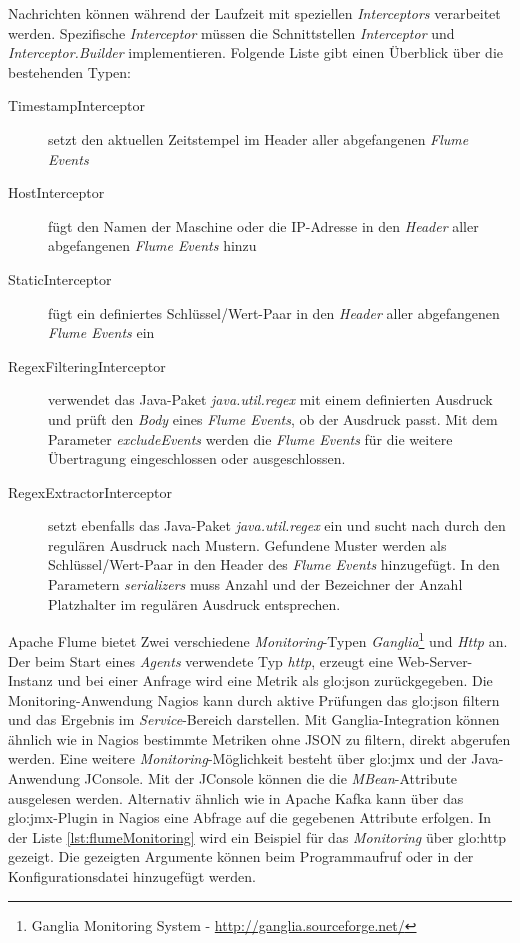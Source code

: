 Nachrichten können während der Laufzeit mit speziellen \textit{Interceptors} verarbeitet werden. Spezifische \textit{Interceptor} müssen die Schnittstellen \textit{Interceptor} und \textit{Interceptor.Builder} implementieren. Folgende Liste gibt einen Überblick über die bestehenden Typen:
\begin{description}
	\item[TimestampInterceptor] setzt den aktuellen Zeitstempel im Header aller abgefangenen \textit{Flume Events} 
	\item[HostInterceptor] fügt den Namen der Maschine oder die IP-Adresse in den \textit{Header} aller abgefangenen \textit{Flume Events} hinzu 
	\item[StaticInterceptor] fügt ein definiertes Schlüssel/Wert-Paar in den \textit{Header} aller abgefangenen \textit{Flume Events} ein 
	\item[RegexFilteringInterceptor] verwendet das Java-Paket \textit{java.util.regex} mit einem definierten Ausdruck und prüft den \textit{Body} eines \textit{Flume Events}, ob der Ausdruck passt. Mit dem Parameter \textit{excludeEvents} werden die \textit{Flume Events} für die weitere Übertragung eingeschlossen oder ausgeschlossen. 
	\item[RegexExtractorInterceptor] setzt ebenfalls das Java-Paket \textit{java.util.regex} ein und sucht nach durch den regulären Ausdruck nach Mustern. Gefundene Muster werden als Schlüssel/Wert-Paar in den Header des \textit{Flume Events} hinzugefügt. In den Parametern \textit{serializers} muss Anzahl und der Bezeichner der Anzahl Platzhalter im regulären Ausdruck entsprechen. 
\end{description}

Apache Flume bietet Zwei verschiedene \textit{Monitoring}-Typen \textit{Ganglia}\footnote{Ganglia Monitoring System - \url{http://ganglia.sourceforge.net/}} und \textit{Http} an. Der beim Start eines \textit{Agents} verwendete Typ \textit{http}, erzeugt eine Web-Server-Instanz und bei einer Anfrage wird eine Metrik als \gls{glo:json} zurückgegeben. Die Monitoring-Anwendung Nagios kann durch aktive Prüfungen das \gls{glo:json} filtern und das Ergebnis im \textit{Service}-Bereich darstellen. Mit Ganglia-Integration können ähnlich wie in Nagios bestimmte Metriken ohne JSON zu filtern, direkt abgerufen werden. Eine weitere \textit{Monitoring}-Möglichkeit besteht über \gls{glo:jmx} und der Java-Anwendung JConsole. Mit der JConsole können die die \textit{MBean}-Attribute ausgelesen werden. Alternativ ähnlich wie in Apache Kafka kann über das \gls{glo:jmx}-Plugin in Nagios eine Abfrage auf die gegebenen Attribute erfolgen. In der Liste \ref{lst:flumeMonitoring} wird ein Beispiel für das \textit{Monitoring} über \gls{glo:http} gezeigt. Die gezeigten Argumente können beim Programmaufruf oder in der Konfigurationsdatei hinzugefügt werden. 


